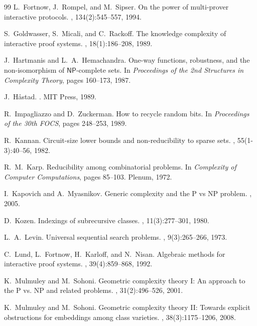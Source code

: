 \documentclass[11pt,a4paper]{article}
\theoremstyle{plain}
\theoremstyle{definition}
\theoremstyle{remark}
\newcommand{\NP}{\mathsf{NP}}
\begin{document}
\begin{thebibliography}{99}
L.~Fortnow, J.~Rompel, and M.~Sipser.
\newblock On the power of multi-prover interactive protocols.
, 134(2):545--557, 1994.

S.~Goldwasser, S.~Micali, and C.~Rackoff.
\newblock The knowledge complexity of interactive proof systems.
, 18(1):186--208, 1989.

J.~Hartmanis and L.~A.~Hemachandra.
\newblock One-way functions, robustness, and the non-isomorphism of
$\NP$-complete sets.
\newblock In {\em Proceedings of the 2nd Structures in Complexity Theory},
pages 160--173, 1987.

J.~H\r{a}stad.
.
\newblock MIT Press, 1989.

R.~Impagliazzo and D.~Zuckerman.
\newblock How to recycle random bits.
\newblock In {\em Proceedings of the 30th FOCS}, pages 248--253, 1989.

R.~Kannan.
\newblock Circuit-size lower bounds and non-reducibility to sparse sets.
, 55(1-3):40--56, 1982.

R.~M.~Karp.
\newblock Reducibility among combinatorial problems.
\newblock In {\em Complexity of Computer Computations}, pages 85--103. Plenum, 1972.

I.~Kapovich and A.~Myasnikov.
\newblock Generic complexity and the P vs NP problem.
, 2005.

D.~Kozen.
\newblock Indexings of subrecursive classes.
, 11(3):277--301, 1980.

L.~A.~Levin.
\newblock Universal sequential search problems.
, 9(3):265--266, 1973.

C.~Lund, L.~Fortnow, H.~Karloff, and N.~Nisan.
\newblock Algebraic methods for interactive proof systems.
, 39(4):859--868, 1992.

K.~Mulmuley and M.~Sohoni.
\newblock Geometric complexity theory I: An approach to the P vs. NP and related
problems.
, 31(2):496--526, 2001.

K.~Mulmuley and M.~Sohoni.
\newblock Geometric complexity theory II: Towards explicit obstructions for
embeddings among class varieties.
, 38(3):1175--1206, 2008.


\end{thebibliography}
\end{document}
